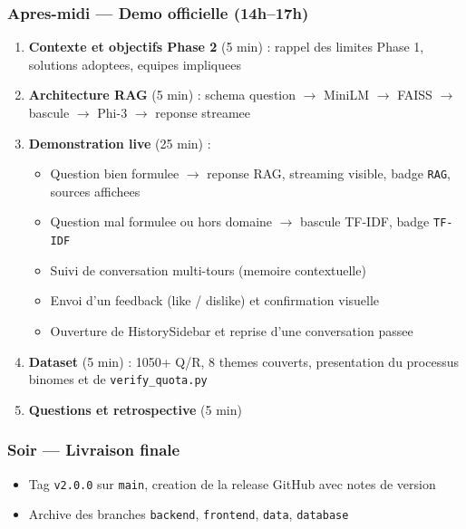 \documentclass[11pt,a4paper]{article}
\begin{document}
\subsubsection{Apres-midi --- Demo officielle (14h--17h)}

\begin{important}
\begin{enumerate}
    \item \textbf{Contexte et objectifs Phase 2} (5 min) : rappel des limites Phase 1, solutions adoptees, equipes impliquees
    \item \textbf{Architecture RAG} (5 min) : schema question $\rightarrow$ MiniLM $\rightarrow$ FAISS $\rightarrow$ bascule $\rightarrow$ Phi-3 $\rightarrow$ reponse streamee
    \item \textbf{Demonstration live} (25 min) :
    \begin{itemize}
        \item Question bien formulee $\rightarrow$ reponse RAG, streaming visible, badge \texttt{RAG}, sources affichees
        \item Question mal formulee ou hors domaine $\rightarrow$ bascule TF-IDF, badge \texttt{TF-IDF}
        \item Suivi de conversation multi-tours (memoire contextuelle)
        \item Envoi d'un feedback (like / dislike) et confirmation visuelle
        \item Ouverture de HistorySidebar et reprise d'une conversation passee
    \end{itemize}
    \item \textbf{Dataset} (5 min) : 1050+ Q/R, 8 themes couverts, presentation du processus binomes et de \texttt{verify\_quota.py}
    \item \textbf{Questions et retrospective} (5 min)
\end{enumerate}
\end{important}

\subsubsection{Soir --- Livraison finale}
\begin{itemize}
    \item[$\square$] Tag \texttt{v2.0.0} sur \texttt{main}, creation de la release GitHub avec notes de version
    \item[$\square$] Archive des branches \texttt{backend}, \texttt{frontend}, \texttt{data}, \texttt{database}
\end{itemize}
\end{document}
